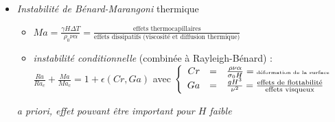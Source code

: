 \begin{frame}[fragile]
\begin{itemize}
\begin{columns}[T]
\begin{column}{0.65\textwidth}
\begin{itemize}
\end{itemize}
    \end{column}
    \end{columns}
\item \emph{Instabilité de Bénard-Marangoni} thermique
\begin{itemize}
\item $Ma=\frac{\gamma H \Delta T}{\rho_0 \nu \alpha}=\frac{\text{effets thermocapillaires}}{\text{effets dissipatifs (viscosité et diffusion thermique)}}$
\item \emph{instabilité conditionnelle} (combinée à Rayleigh-Bénard) : \cite{Nield1964} \\
$\displaystyle \frac{Ra}{Ra_c} + \frac{Ma}{Ma_c} = 1 + \epsilon(Cr,Ga)$ 
avec $\left\{\begin{array}{rcl} 
      Cr&=&\frac{\rho\nu\alpha}{\sigma_0 H} ={\tiny\text{déformation de la surface}} \\ 
      Ga&=&\frac{gH^3}{\nu^2}=\frac{\text{effets de flottabilité}}{\text{effets visqueux}}\end{array}\right.$
\end{itemize}
\emph{\textit{a priori}, effet pouvant être important pour $H$ faible}
\end{itemize}
\end{frame}

